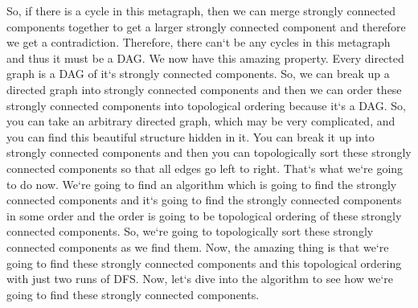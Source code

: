 So, if there is a cycle in this metagraph, then we can merge strongly connected components together to get a larger strongly connected component and therefore we get a contradiction.
Therefore, there can`t be any cycles in this metagraph and thus it must be a DAG\@.
We now have this amazing property.
Every directed graph is a DAG of it`s strongly connected components.
So, we can break up a directed graph into strongly connected components and then we can order these strongly connected components into topological ordering because it`s a DAG\@.
So, you can take an arbitrary directed graph, which may be very complicated, and you can find this beautiful structure hidden in it.
You can break it up into strongly connected components and then you can topologically sort these strongly connected components so that all edges go left to right.
That`s what we`re going to do now.
We`re going to find an algorithm which is going to find the strongly connected components and it`s going to find the strongly connected components in some order and the order is going to be topological ordering of these strongly connected components.
So, we`re going to topologically sort these strongly connected components as we find them.
Now, the amazing thing is that we`re going to find these strongly connected components and this topological ordering with just two runs of DFS\@.
Now, let`s dive into the algorithm to see how we`re going to find these strongly connected components.

